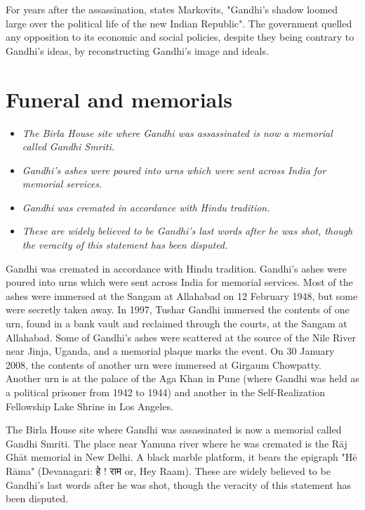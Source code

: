 For years after the assassination, states Markovits, "Gandhi's shadow
loomed large over the political life of the new Indian Republic". The
government quelled any opposition to its economic and social policies,
despite they being contrary to Gandhi's ideas, by reconstructing
Gandhi's image and ideals.

\section{Funeral and memorials}\label{funeral-and-memorials}

\begin{itemize}
\item
  \emph{The Birla House site where Gandhi was assassinated is now a
  memorial called Gandhi Smriti.}
\item
  \emph{Gandhi's ashes were poured into urns which were sent across
  India for memorial services.}
\item
  \emph{Gandhi was cremated in accordance with Hindu tradition.}
\item
  \emph{These are widely believed to be Gandhi's last words after he was
  shot, though the veracity of this statement has been disputed.}
\end{itemize}

Gandhi was cremated in accordance with Hindu tradition. Gandhi's ashes
were poured into urns which were sent across India for memorial
services. Most of the ashes were immersed at the Sangam at Allahabad on
12 February 1948, but some were secretly taken away. In 1997, Tushar
Gandhi immersed the contents of one urn, found in a bank vault and
reclaimed through the courts, at the Sangam at Allahabad. Some of
Gandhi's ashes were scattered at the source of the Nile River near
Jinja, Uganda, and a memorial plaque marks the event. On 30 January
2008, the contents of another urn were immersed at Girgaum Chowpatty.
Another urn is at the palace of the Aga Khan in Pune (where Gandhi was
held as a political prisoner from 1942 to 1944) and another in the
Self-Realization Fellowship Lake Shrine in Los Angeles.

The Birla House site where Gandhi was assassinated is now a memorial
called Gandhi Smriti. The place near Yamuna river where he was cremated
is the Rāj Ghāt memorial in New Delhi. A black marble platform, it bears
the epigraph "Hē Rāma" (Devanagari: हे ! राम or, Hey Raam). These are
widely believed to be Gandhi's last words after he was shot, though the
veracity of this statement has been disputed.

